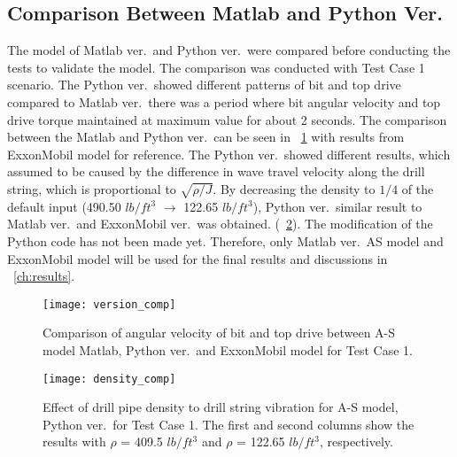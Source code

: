 \subsection{Comparison Between Matlab and Python Ver.}
The model of Matlab ver.\ and Python ver.\ were compared before conducting the tests to validate the model. The comparison was conducted with Test Case 1 scenario. The Python ver.\ showed different patterns of bit and top drive compared to Matlab ver.\ there was a period where bit angular velocity and top drive torque maintained at maximum value for about 2 seconds. The comparison between the Matlab and Python ver.\ can be seen in \figurename~\ref{figure_Test1_comp_chASmodel} with results from ExxonMobil model for reference. The Python ver.\ showed different results, which assumed to be caused by the difference in wave travel velocity along the drill string, which is proportional to $\sqrt{\rho/J}$. By decreasing the density to $1/4$ of the default input (490.50 $lb/ft^3$ $\rightarrow$ 122.65 $lb/ft^3$), Python ver.\, similar result to Matlab ver.\ and ExxonMobil ver.\ was obtained. (\figurename~\ref{figure_Python_reducedDensity}). The modification of the Python code has not been made yet. Therefore, only Matlab ver.\ AS model and ExxonMobil model will be used for the final results and discussions in \chaptername~\ref{ch:results}.

\begin{figure}[!hbt]
  \centering
  \texttt{[image: version\_comp]}
  \caption[Comparison between different models for Test case 1]{Comparison of angular velocity of bit and top drive between A-S model Matlab, Python ver.\ and ExxonMobil model for Test Case 1.}\label{figure_Test1_comp_chASmodel}
\end{figure}

\newpage
\begin{figure}[!hbt]
  \centering
  \texttt{[image: density\_comp]}
  \caption[Effect of drill pipe density in Python ver.\ for Test Case 1]{Effect of drill pipe density to drill string vibration for A-S model, Python ver.\ for Test Case 1.  The first and second columns show the results with $\rho$ = 409.5 $lb/ft^3$ and  $\rho$ = 122.65 $lb/ft^3$, respectively.}\label{figure_Python_reducedDensity}
\end{figure}

 
